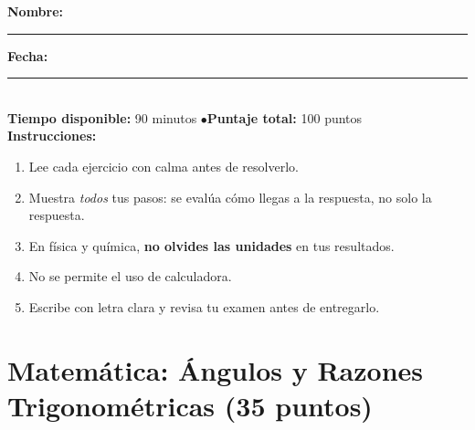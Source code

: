 \documentclass[12pt, letterpaper]{article}
\begin{document}


\vspace{4pt}
\begin{cuadroinfo}
  \small
  \textbf{Nombre:} \rule{0.55\linewidth}{0.4pt} \quad \textbf{Fecha:} \rule{0.15\linewidth}{0.4pt} \\[6pt]
  \textbf{Tiempo disponible:} 90 minutos \quad$\bullet$\quad \textbf{Puntaje total:} 100 puntos \\[4pt]
  \textbf{Instrucciones:}
  \begin{enumerate}[leftmargin=*]
    \item Lee cada ejercicio con calma antes de resolverlo.
    \item Muestra \emph{todos} tus pasos: se evalúa cómo llegas a la respuesta, no solo la respuesta.
    \item En física y química, \textbf{no olvides las unidades} en tus resultados.
    \item No se permite el uso de calculadora.
    \item Escribe con letra clara y revisa tu examen antes de entregarlo.
  \end{enumerate}
\end{cuadroinfo}

\vspace{8pt}

\section{Matemática: Ángulos y Razones Trigonométricas (35 puntos)}
\end{document}
